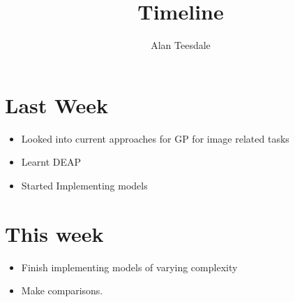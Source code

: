\documentclass[7.5pt,twocolumn]{article}
\title{Timeline}
\author{Alan Teesdale}
\begin{document}
	\maketitle
	\section{Last Week}
	\begin{itemize}
		\item Looked into current approaches for GP for image related tasks
		\item Learnt DEAP
		\item Started Implementing models
	\end{itemize}
	\section{This week}
	\begin{itemize}
		\item Finish implementing models of varying complexity
		\item Make comparisons.
	\end{itemize}
\end{document}
